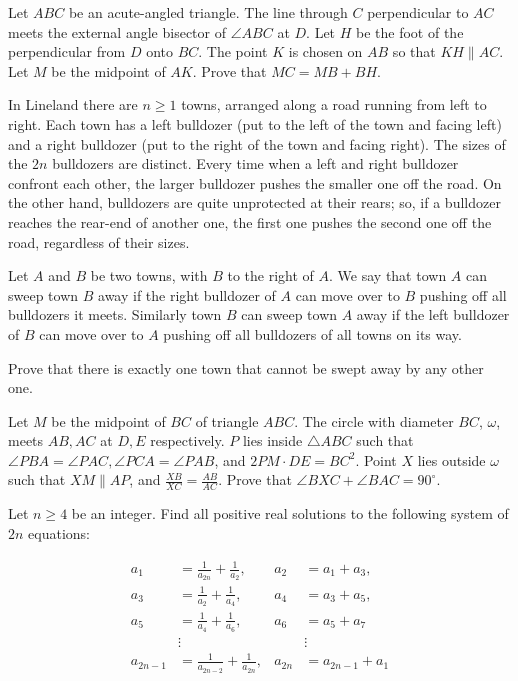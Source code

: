 \documentclass[11pt]{scrartcl}
\begin{document}
\begin{problem}[5441518070935718077]
	Let $ABC$ be an acute-angled triangle. The line through $C$ perpendicular to $AC$ meets the external angle bisector of $\angle ABC$ at $D$. Let $H$ be the foot of the perpendicular from $D$ onto $BC$. The point $K$ is chosen on $AB$ so that $KH \parallel AC$. Let $M$ be the midpoint of $AK$. Prove that $MC = MB + BH$.
\end{problem}
\begin{problem}[923057111976190018]
In Lineland there are $n\geq1$ towns, arranged along a road running from left to right. Each town has a left bulldozer (put to the left of the town and facing left) and a right bulldozer (put to the right of the town and facing right). The sizes of the $2n$ bulldozers are distinct. Every time when a left and right bulldozer confront each other, the larger bulldozer pushes the smaller one off the road. On the other hand, bulldozers are quite unprotected at their rears; so, if a bulldozer reaches the rear-end of another one, the first one pushes the second one off the road, regardless of their sizes.

Let $A$ and $B$ be two towns, with $B$ to the right of $A$. We say that town $A$ can sweep town $B$ away if the right bulldozer of $A$ can move over to $B$ pushing off all bulldozers it meets. Similarly town $B$ can sweep town $A$ away if the left bulldozer of $B$ can move over to $A$ pushing off all bulldozers of all towns on its way.

Prove that there is exactly one town that cannot be swept away by any other one.
\end{problem}
\begin{problem}[591652153716935]
	Let $M$ be the midpoint of $BC$ of triangle $ABC$. The circle with diameter $BC$, $\omega$, meets $AB,AC$ at $D,E$ respectively. $P$ lies inside $\triangle ABC$ such that $\angle PBA=\angle PAC, \angle PCA=\angle PAB$, and $2PM\cdot DE=BC^2$. Point $X$ lies outside $\omega$ such that $XM\parallel AP$, and $\frac{XB}{XC}=\frac{AB}{AC}$. Prove that $\angle BXC +\angle BAC=90^{\circ}$.
\end{problem}
\begin{problem}[4835329555526569551]
Let $n \geq 4$ be an integer. Find all positive real solutions to the following system of $2n$ equations:

\begin{align*}
a_{1} &=\frac{1}{a_{2 n}}+\frac{1}{a_{2}}, & a_{2}&=a_{1}+a_{3}, \\
a_{3}&=\frac{1}{a_{2}}+\frac{1}{a_{4}}, & a_{4}&=a_{3}+a_{5}, \\
a_{5}&=\frac{1}{a_{4}}+\frac{1}{a_{6}}, & a_{6}&=a_{5}+a_{7} \\
&\vdots & &\vdots \\
a_{2 n-1}&=\frac{1}{a_{2 n-2}}+\frac{1}{a_{2 n}}, & a_{2 n}&=a_{2 n-1}+a_{1}
\end{align*}
\end{problem}
\end{document}
